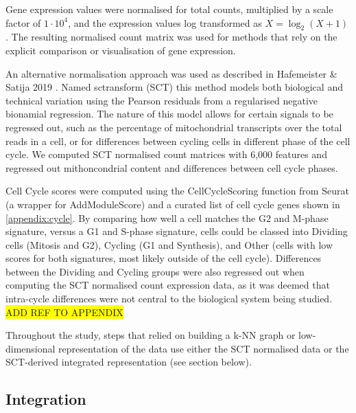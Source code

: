 Gene expression values were normalised for total counts, multiplied by a scale factor of  \(1\cdot10^4\), and the expression values log transformed as \(X = \log_2 (X+1)\). The resulting normalised count matrix was used for methods that rely on the explicit comparison or visualisation of gene expression.

An alternative normalisation approach was used as described in Hafemeister \& Satija 2019 \cite{hafemeister_normalization_2019}. Named sctransform (SCT) this method models both biological and technical variation using the Pearson residuals from a regularised negative bionamial regression. The nature of this model allows for certain signals to be regressed out, such as the percentage of mitochondrial transcripts over the total reads in a cell, or for differences between cycling cells in different phase of the cell cycle. We computed SCT normalised count matrices with 6,000 features and regressed out mithoncondrial content and differences between cell cycle phases.

Cell Cycle scores were computed using the CellCycleScoring function from Seurat (a wrapper for AddModuleScore) and a curated list of cell cycle genes shown in \ref{appendix:cycle}. By comparing how well a cell matches the G2 and M-phase signature, versus a G1 and S-phase signature, cells could be classed into Dividing cells (Mitosis and G2), Cycling (G1 and Synthesis), and Other (cells with low scores for both signatures, most likely outside of the cell cycle). Differences between the Dividing and Cycling groups were also regressed out when computing the SCT normalised count expression data, as it was deemed that intra-cycle differences were not central to the biological system being studied. \colorbox{yellow}{ADD REF TO APPENDIX}

Throughout the study, steps that relied on building a k-NN graph or low-dimensional representation of the data use either the SCT normalised data or the SCT-derived integrated representation (see section below).

\subsection*{Integration}


